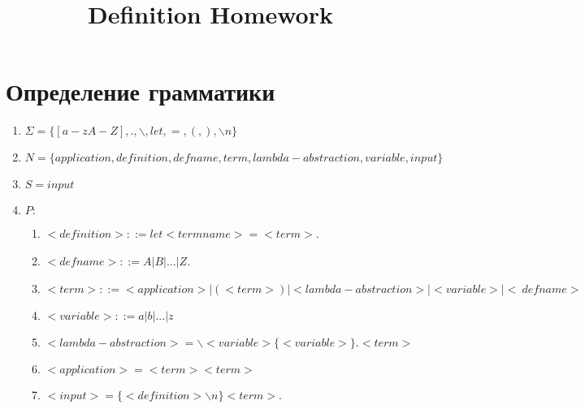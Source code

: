 \documentclass[12pt]{article}
\title{Definition Homework}
\begin{document}
\indent   
\section{Определение грамматики}
\begin{enumerate} 
    \item $\Sigma = \{[a-zA-Z],.,\backslash, let, =, (, ),\backslash n\}$
    \item $N = \{application, definition, defname, term, lambda-abstraction, variable, input\}$
    \item $S = input$
    \item $P:$ 
        \begin{enumerate} [1)]
            \item $<definition> ::= let <termname> = <term>$.
            \item $<defname> ::= A | B | ... | Z$.
            \item $<term> ::= <application> | (<term>) | <lambda-abstraction> | <variable> | <~defname>$
            \item $<variable> ::= a | b | ... | z$
            \item $<lambda-abstraction> = \backslash<variable>\{<variable>\}.<term>$
            \item $<application> = <term> <term>$
            \item $<input> = \{<definition> \backslash n\} <term>$.
        \end{enumerate}
\end{enumerate}
\end{document}
